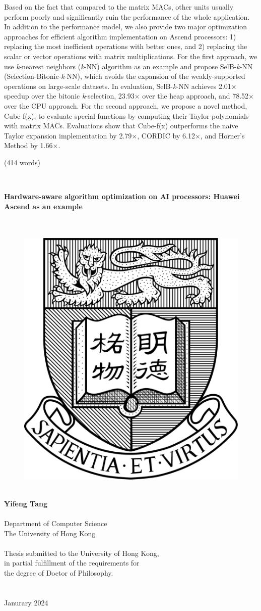 \documentclass[12pt]{extbook}
\begin{document}
Based on the fact that compared to the matrix MACs, other units usually perform poorly and significantly ruin the performance of the whole application.
In addition to the performance model, we also provide two major optimization approaches for efficient algorithm implementation on Ascend processors: 1) replacing the most inefficient operations with better ones, and 2) replacing the scalar or vector operations with matrix multiplications. For the first approach, we use \textit{k}-nearest neighbors (\textit{k}-NN) algorithm as an example and propose SelB-\textit{k}-NN (Selection-Bitonic-\textit{k}-NN), which avoids the expansion of the weakly-supported operations on large-scale datasets. In evaluation, SelB-\textit{k}-NN achieves 2.01$\times$ speedup over the bitonic \textit{k}-selection, 23.93$\times$ over the heap approach, and 78.52$\times$ over the CPU approach. For the second approach, we propose a novel method, Cube-f(x), to evaluate special functions by computing their Taylor polynomials with matrix MACs. Evaluations show that Cube-f(x) outperforms the naive Taylor expansion implementation by 2.79$\times$, CORDIC by 6.12$\times$, and Horner's Method by 1.66$\times$.

(414 words)

\newpage
\thispagestyle{empty}
~\\


\newpage
\thispagestyle{empty}
\centering

{\Large \bf 
    Hardware-aware algorithm optimization on AI processors: Huawei Ascend as an example
}\\
~\\
~\\
\begin{figure}[htbp]
    \centering
    \includegraphics[width=5 cm]{fig/logo}
    \label{fig:logo}
\end{figure}
~\\
{\bf \large Yifeng Tang}\\
~\\
Department of Computer Science\\
The University of Hong Kong\\
~\\
Thesis submitted to the University of Hong Kong,\\
in partial fulfillment of the requirements for\\
the degree of Doctor of Philosophy.\\
~\\
~\\
Janurary 2024\\
\end{document}
